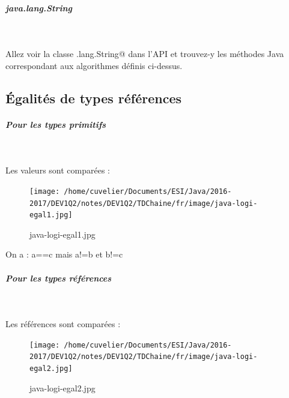 \documentclass[11pt,a4paper]{article}
\begin{document}
		\subparagraph{java.lang.String} 
		
					\textcolor{white}{.} \par
				
		    Allez voir la classe \verb@java.lang.String@ dans l'API
		    et trouvez-y les m\'ethodes Java correspondant aux algorithmes d\'efinis ci-dessus.
		  
            \par
        
            \par
        \subsection{\'Egalit\'es de types r\'ef\'erences}
			
		\subparagraph{Pour les types primitifs} 
		
					\textcolor{white}{.} \par
				
		    Les valeurs sont compar\'ees :
		  
            \par
        \begin{figure}[hbt]
				    \begin{center}
					\texttt{[image: /home/cuvelier/Documents/ESI/Java/2016-2017/DEV1Q2/notes/DEV1Q2/TDChaine/fr/image/java-logi-egal1.jpg]}
						\end{center}
                
                    \caption[java-logi-egal1.jpg]{java-logi-egal1.jpg}
                \end{figure}
                    
            \par
        
        On a : a==c mais a!=b et b!=c
      
            \par
        
			
		\subparagraph{Pour les types r\'ef\'erences} 
		
					\textcolor{white}{.} \par
				
		    Les r\'ef\'erences sont compar\'ees :
		  
            \par
        \begin{figure}[hbt]
				    \begin{center}
					\texttt{[image: /home/cuvelier/Documents/ESI/Java/2016-2017/DEV1Q2/notes/DEV1Q2/TDChaine/fr/image/java-logi-egal2.jpg]}
						\end{center}
                
                    \caption[java-logi-egal2.jpg]{java-logi-egal2.jpg}
                \end{figure}
                    
\end{document}
